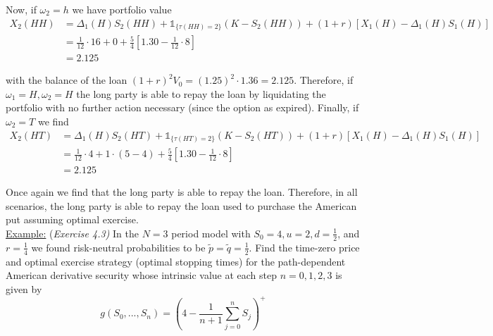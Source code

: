 \documentclass[12pt]{article}
\newlength\tindent
\renewcommand{\indent}{\hspace*{\tindent}}
\begin{document}
Now, if $\omega_2 = h$ we have portfolio value
\begin{align*}
	X_2(HH) &= \Delta_1(H)S_2(HH) + \mathds 1_{\{ \tau(HH) = 2\}}(K - S_2(HH)) + (1 + r)[X_1(H) - \Delta_1(H)S_1(H)] \\
	&= \frac{1}{12}\cdot 16 + 0 + \frac{5}{4}\left[ 1.30 - \frac{1}{12}\cdot 8 \right] \\
	&= 2.125
\end{align*}

with the balance of the loan $(1 + r)^2V_0 = (1.25)^2\cdot 1.36 = 2.125$. Therefore, if $\omega_1 = H, \omega_2 = H$ the long party is able to repay the loan by liquidating the portfolio with no further action necessary (since the option as expired). Finally, if $\omega_2 = T$ we find
\begin{align*}
	X_2(HT) &= \Delta_1(H)S_2(HT) + \mathds 1_{\{ \tau(HT) = 2\}}(K - S_2(HT)) + (1 + r)[X_1(H) - \Delta_1(H)S_1(H)] \\
	&= \frac{1}{12}\cdot 4 + 1\cdot (5 - 4) + \frac{5}{4}\left[ 1.30 - \frac{1}{12}\cdot 8 \right] \\
	&= 2.125
\end{align*}

\indent Once again we find that the long party is able to repay the loan. Therefore, in all scenarios, the long party is able to repay the loan used to purchase the American put assuming optimal exercise. \\

\underline{Example:} {(\em Exercise 4.3)} In the $N = 3$ period model with $S_0 = 4, u = 2, d = \frac{1}{2}$, and $r = \frac{1}{4}$ we found risk-neutral probabilities to be $\tilde{p} = \tilde{q} = \frac{1}{2}$. Find the time-zero price and optimal exercise strategy (optimal stopping times) for the path-dependent American derivative security whose intrinsic value at each step $n = 0,1,2,3$ is given by
\begin{equation*}
	g(S_0,...,S_n) = \left(4 - \frac{1}{n + 1}\sum^n_{j = 0} S_j \right)^+
\end{equation*} 
\end{document}
